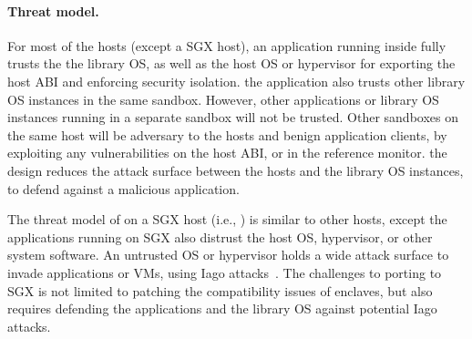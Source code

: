 \paragraph{Threat model.}
For most of the \graphene{} hosts (except a SGX host),
an application running inside \graphene{} fully trusts the the library OS,
as well as the host OS or hypervisor
for exporting the host ABI and enforcing security isolation.
the application also trusts other library OS instances in the same sandbox.
However, other applications or library OS instances running in a separate sandbox
will not be trusted.
Other sandboxes on the same host
will be adversary to the hosts and benign application clients,
by exploiting any vulnerabilities on the host ABI, or in the reference monitor.
the \graphene{} design reduces the attack surface between the hosts and the library OS instances, to defend against a malicious application.




The threat model of \graphene{} on a SGX host (i.e., \graphenesgx{}) is similar to other hosts, except the applications running on SGX also distrust the host OS, hypervisor, or other system software.
An untrusted OS or hypervisor
holds a wide attack surface to invade applications or VMs,
using Iago attacks~\cite{checkoway13iago}.
The challenges to porting \graphene{} to SGX is not limited to patching the compatibility issues of enclaves, but also requires defending the applications and the library OS against potential Iago attacks.







